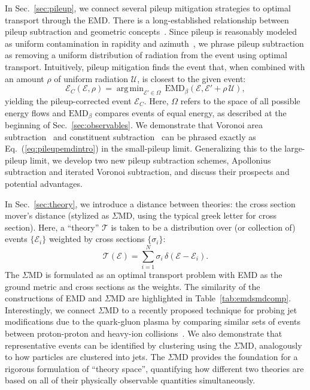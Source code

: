 \documentclass[letterpaper,11pt]{article}
\DeclareMathOperator*{\argmin}{arg\,min}
\newcommand{\E}{\mathcal{E}}
\DeclareRobustCommand{\Sec}[1]{Sec.~\ref{#1}}
\DeclareRobustCommand{\Tab}[1]{Table~\ref{#1}}
\DeclareRobustCommand{\Eq}[1]{Eq.~(\ref{#1})}
\newcommand{\EMD}{\text{EMD}\xspace}
\begin{document}
In \Sec{sec:pileup}, we connect several pileup mitigation strategies to optimal transport through the EMD.
%
There is a long-established relationship between pileup subtraction and geometric concepts~\cite{Cacciari:2007fd,Cacciari:2008gn,Soyez:2012hv,Berta:2014eza,Bertolini:2014bba,Soyez:2018opl,Berta:2019hnj}.
%
Since pileup is reasonably modeled as uniform contamination in rapidity and azimuth~\cite{Soyez:2018opl}, we phrase pileup subtraction as removing a uniform distribution of radiation from the event using optimal transport.
%
Intuitively, pileup mitigation finds the event that, when combined with an amount $\rho$ of uniform radiation $\mathcal U$, is closest to the given event:
%
\begin{equation}\label{eq:pileupemdintro}
\mathcal E_C(\mathcal E, \rho) = \argmin_{\mathcal E' \in \Omega}\,\EMD_\beta(\mathcal E,\mathcal E' + \rho\,\mathcal U),
\end{equation}
%
yielding the pileup-corrected event $\mathcal E_C$.
%
Here, $\Omega$ refers to the space of all possible energy flows and $\EMD_\beta$ compares events of equal energy, as described at the beginning of \Sec{sec:observables}.
%
We demonstrate that Voronoi area subtraction~\cite{Cacciari:2007fd,Cacciari:2008gn} and constituent subtraction~\cite{Berta:2014eza} can be phrased exactly as \Eq{eq:pileupemdintro} in the small-pileup limit.
%
Generalizing this to the large-pileup limit, we develop two new pileup subtraction schemes, Apollonius subtraction and iterated Voronoi subtraction, and discuss their prospects and potential advantages.


In \Sec{sec:theory}, we introduce a distance between theories: the cross section mover's distance (stylized as $\Sigma$MD, using the typical greek letter for cross section).
%
Here, a ``theory'' $\mathcal T$ is taken to be a distribution over (or collection of) events $\{\E_i\}$ weighted by cross sections $\{\sigma_i\}$:
\begin{equation}
\label{eq:T_defintro}
\mathcal{T}(\mathcal E) = \sum_{i = 1}^N \sigma_i \, \delta(\mathcal E - \mathcal E_i).
\end{equation}
%
The $\Sigma$MD is formulated as an optimal transport problem with EMD as the ground metric and cross sections as the weights.
%
The similarity of the constructions of EMD and $\Sigma$MD are highlighted in \Tab{tab:emdsmdcomp}.
%
Interestingly, we connect $\Sigma$MD to a recently proposed technique for probing jet modifications due to the quark-gluon plasma by comparing similar sets of events between proton-proton and heavy-ion collisions~\cite{Brewer:2018dfs}.
%
We also demonstrate that representative events can be identified by clustering using the $\Sigma$MD, analogously to how particles are clustered into jets.
%
The $\Sigma$MD provides the foundation for a rigorous formulation of ``theory space'', quantifying how different two theories are based on all of their physically observable quantities simultaneously.
\end{document}

